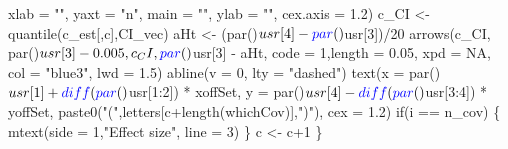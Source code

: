 \documentclass[11pt,]{article}
\newenvironment{Shaded}{}{}
\newcommand{\KeywordTok}[1]{\textcolor[rgb]{0.00,0.00,1.00}{#1}}
\newcommand{\DataTypeTok}[1]{#1}
\newcommand{\DecValTok}[1]{#1}
\newcommand{\FloatTok}[1]{#1}
\newcommand{\StringTok}[1]{\textcolor[rgb]{0.00,0.50,0.50}{#1}}
\newcommand{\OtherTok}[1]{\textcolor[rgb]{1.00,0.25,0.00}{#1}}
\newcommand{\ControlFlowTok}[1]{\textcolor[rgb]{0.00,0.00,1.00}{#1}}
\newcommand{\OperatorTok}[1]{#1}
\newcommand{\NormalTok}[1]{#1}
\begin{document}
\begin{Shaded}
\begin{Highlighting}[]
       \DataTypeTok{xlab =} \StringTok{""}\NormalTok{, }\DataTypeTok{yaxt =} \StringTok{"n"}\NormalTok{, }\DataTypeTok{main =} \StringTok{""}\NormalTok{, }\DataTypeTok{ylab =} \StringTok{""}\NormalTok{, }\DataTypeTok{cex.axis =} \FloatTok{1.2}\NormalTok{)}
\NormalTok{  c_CI <-}\StringTok{ }\KeywordTok{quantile}\NormalTok{(c_est[,c],CI_vec)}
\NormalTok{  aHt <-}\StringTok{ }\NormalTok{(}\KeywordTok{par}\NormalTok{()}\OperatorTok{$}\NormalTok{usr[}\DecValTok{4}\NormalTok{]}\OperatorTok{-}\KeywordTok{par}\NormalTok{()}\OperatorTok{$}\NormalTok{usr[}\DecValTok{3}\NormalTok{])}\OperatorTok{/}\DecValTok{20}
  \KeywordTok{arrows}\NormalTok{(c_CI, }\KeywordTok{par}\NormalTok{()}\OperatorTok{$}\NormalTok{usr[}\DecValTok{3}\NormalTok{]}\OperatorTok{-}\FloatTok{0.005}\NormalTok{, c_CI, }\KeywordTok{par}\NormalTok{()}\OperatorTok{$}\NormalTok{usr[}\DecValTok{3}\NormalTok{] }\OperatorTok{-}\StringTok{ }\NormalTok{aHt,}
         \DataTypeTok{code =} \DecValTok{1}\NormalTok{,}\DataTypeTok{length =} \FloatTok{0.05}\NormalTok{, }\DataTypeTok{xpd =} \OtherTok{NA}\NormalTok{, }\DataTypeTok{col =} \StringTok{"blue3"}\NormalTok{, }\DataTypeTok{lwd =} \FloatTok{1.5}\NormalTok{)}
  \KeywordTok{abline}\NormalTok{(}\DataTypeTok{v =} \DecValTok{0}\NormalTok{, }\DataTypeTok{lty =} \StringTok{"dashed"}\NormalTok{)}
  \KeywordTok{text}\NormalTok{(}\DataTypeTok{x =} \KeywordTok{par}\NormalTok{()}\OperatorTok{$}\NormalTok{usr[}\DecValTok{1}\NormalTok{] }\OperatorTok{+}\StringTok{ }\KeywordTok{diff}\NormalTok{(}\KeywordTok{par}\NormalTok{()}\OperatorTok{$}\NormalTok{usr[}\DecValTok{1}\OperatorTok{:}\DecValTok{2}\NormalTok{]) }\OperatorTok{*}\StringTok{ }\NormalTok{xoffSet,}
       \DataTypeTok{y =} \KeywordTok{par}\NormalTok{()}\OperatorTok{$}\NormalTok{usr[}\DecValTok{4}\NormalTok{] }\OperatorTok{-}\StringTok{ }\KeywordTok{diff}\NormalTok{(}\KeywordTok{par}\NormalTok{()}\OperatorTok{$}\NormalTok{usr[}\DecValTok{3}\OperatorTok{:}\DecValTok{4}\NormalTok{]) }\OperatorTok{*}\StringTok{ }\NormalTok{yoffSet,}
       \KeywordTok{paste0}\NormalTok{(}\StringTok{"("}\NormalTok{,letters[c}\OperatorTok{+}\KeywordTok{length}\NormalTok{(whichCov)],}\StringTok{")"}\NormalTok{),}
       \DataTypeTok{cex =} \FloatTok{1.2}\NormalTok{)}
  \ControlFlowTok{if}\NormalTok{(i }\OperatorTok{==}\StringTok{ }\NormalTok{n_cov) \{ }\KeywordTok{mtext}\NormalTok{(}\DataTypeTok{side =} \DecValTok{1}\NormalTok{,}\StringTok{"Effect size"}\NormalTok{, }\DataTypeTok{line =} \DecValTok{3}\NormalTok{) \}}
\NormalTok{  c <-}\StringTok{ }\NormalTok{c}\OperatorTok{+}\DecValTok{1}
\NormalTok{\}}
\end{Highlighting}
\end{Shaded}
\end{document}
